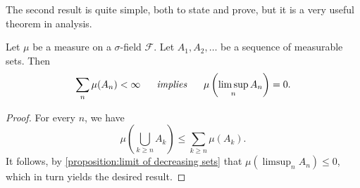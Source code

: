The second result is quite simple, both to state and prove, but it is a very useful theorem in analysis.
\begin{thrm}\label{theorem:Borel-Cantelli Lemma}
  Let \(\mu\) be a measure on a \(\sigma\)-field \(\mathcal{F}\). Let \(A_{1},A_{2},\dotsc\) be a sequence
  of measurable sets. Then
  \[\sum_n\mu(A_{n})<\infty \text{ ~~~ \emph{implies} ~~~ }\mu\left(\limsup_{n}A_{n}\right)=0.\]
\end{thrm}
\begin{proof}
  For every \(n\), we have \[\mu\left(\bigcup_{k\geq n}A_{k}\right)\leq\sum_{k\geq n}\mu(A_{k}).\]
  It follows, by \cref{proposition:limit of decreasing sets} that \(\mu(\limsup_{n}A_{n})\leq0\), which in turn yields the desired result.
\end{proof}
